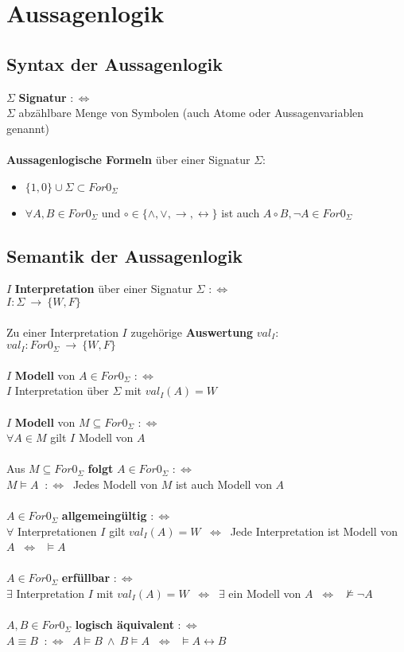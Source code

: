 \documentclass[a4paper,11pt]{scrartcl}
\newcommand{\tbf}{\textbf}
\newcommand{\Lra}{\Leftrightarrow}
\newcommand{\Forn}{For0_\Sigma}
\newcommand{\fol}{\vDash}
\newcommand{\nfol}{\nvDash}
\theoremstyle{default}
\begin{document}
\newpage
\section{Aussagenlogik}
\subsection{Syntax der Aussagenlogik}
$\Sigma$ \tbf{Signatur} $:\Lra$ \\
$\Sigma$ abzählbare Menge von Symbolen (auch Atome oder Aussagenvariablen genannt)\\
\ \\ \tbf{Aussagenlogische Formeln} über einer Signatur $\Sigma$:
\begin{itemize}
 \item $\{1,0\} \cup \Sigma \subset \Forn$ 
 \item $\forall A,B \in \Forn$ und $\circ \in \{\land, \lor, \rightarrow, \leftrightarrow \}$ ist auch $A \circ B, \neg A \in \Forn$
\end{itemize}

\subsection{Semantik der Aussagenlogik}
$I$ \tbf{Interpretation} über einer Signatur $\Sigma$ $:\Lra$ \\
$I: \Sigma \ \rightarrow \ \{W, F\}$ \\
\ \\ Zu einer Interpretation $I$ zugehörige \tbf{Auswertung} $val_I$: \\
$val_I: \Forn \ \rightarrow \ \{W, F\}$ \\
\ \\ $I$ \tbf{Modell} von $A \in \Forn$ $:\Lra$ \\
$I$ Interpretation über $\Sigma$ mit $val_I(A) = W$ \\
\ \\ $I$ \tbf{Modell} von $M \subseteq \Forn$ $:\Lra$ \\
$\forall A \in M$ gilt $I$ Modell von $A$ \\
\ \\ Aus $M \subseteq \Forn$ \tbf{folgt} $A \in \Forn$ $:\Lra$ \\
$M \fol A$ $\ :\Lra \ $ Jedes Modell von $M$ ist auch Modell von $A$ \\
\ \\ $A \in \Forn$ \tbf{allgemeingültig} $:\Lra$ \\
$\forall$ Interpretationen $I$ gilt $val_I(A) = W$ $\ \Lra \ $ Jede Interpretation ist Modell von $A$ $\ \Lra \ $ $\fol A$ \\
\ \\ $A \in \Forn$ \tbf{erfüllbar} $:\Lra$ \\
$\exists$ Interpretation $I$ mit $val_I(A) = W$ $\ \Lra \ $ $\exists$ ein Modell von $A$ $\ \Lra \ $ $\nfol \neg A$ \\
\ \\ $A, B \in \Forn$ \tbf{logisch äquivalent} $:\Lra$ \\
$A \equiv B$ $\ :\Lra \ $ $A \fol B \ \land \ B \fol A$ $\ \Lra \ $ $\fol A \leftrightarrow B$ \\
\end{document}
